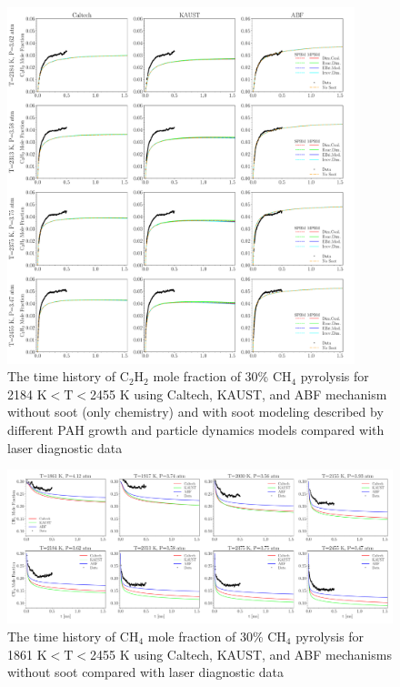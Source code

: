 \begin{figure}[H]
	\centering
	\includegraphics[width=0.9\textwidth]{Figures/Results/Shocktube/Stanford/june/30CH4_C2H2_mechs_s1.pdf}
	\caption{The time history of $\mathrm{C_2H_2}$ mole fraction of 30\% $\mathrm{CH_4}$ pyrolysis for 2184 K$<\mathrm{T}<$2455 K using Caltech, KAUST, and ABF mechanism without soot (only chemistry) and with soot modeling described by different PAH growth and particle dynamics models compared with laser diagnostic data}
	\label{fig:shocktubest_30ch4_c2h2_1} 
\end{figure}


\begin{figure}[H]
	\centering
	\includegraphics[width=1\textwidth]{Figures/Results/Shocktube/Stanford/june/30CH4_CH4_mechs_nosoot.pdf}
	\caption{The time history of $\mathrm{CH_4}$ mole fraction of 30\% $\mathrm{CH_4}$ pyrolysis for 1861 K$<\mathrm{T}<$2455 K using Caltech, KAUST, and ABF mechanisms without soot compared with laser diagnostic data}
	\label{fig:shocktubest_30ch4_nosoot_ch4} 
\end{figure}

